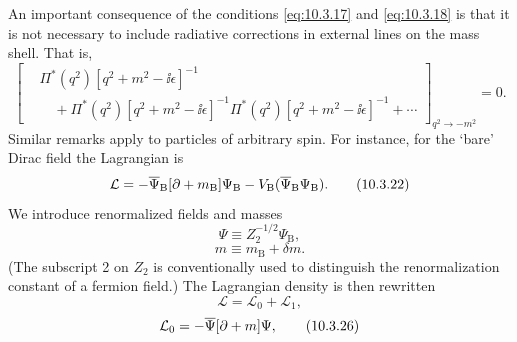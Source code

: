 An important consequence of the conditions \eqref{eq:10.3.17} and
\eqref{eq:10.3.18} is that it is not necessary to include radiative
corrections in external lines on the mass shell. That is,
\begin{equation}
\left[
\begin{aligned}
 &\Pi^*(q^2)[q^2+m^2-\ii\epsilon]^{-1}\\
 &\quad+\Pi^*(q^2)[q^2+m^2-\ii\epsilon]^{-1}\Pi^*(q^2)
 [q^2+m^2-\ii\epsilon]^{-1}+\cdots
\end{aligned}
\right]_{q^2\to-m^2}=0.
\tag{10.3.21}\label{eq:10.3.21}
\end{equation}
Similar remarks apply to particles of arbitrary spin. For instance, for the
`bare' Dirac field the Lagrangian is
\begin{equation}
\mathcal L=-\overline\Psi_{\mathrm B}[\sl{\partial}+m_{\mathrm B}]\Psi_{\mathrm B}
-V_{\mathrm B}(\overline\Psi_{\mathrm B}\Psi_{\mathrm B}).
\tag{10.3.22}\label{eq:10.3.22}
\end{equation}
We introduce renormalized fields and masses
\begin{equation}
\Psi\equiv Z_2^{-1/2}\Psi_{\mathrm B},
\tag{10.3.23}\label{eq:10.3.23}
\end{equation}
\begin{equation}
m\equiv m_{\mathrm B}+\delta m.
\tag{10.3.24}\label{eq:10.3.24}
\end{equation}
(The subscript 2 on $Z_2$ is conventionally used to distinguish the
renormalization constant of a fermion field.) The Lagrangian density is then
rewritten
\begin{equation}
\mathcal L=\mathcal L_0+\mathcal L_1,
\tag{10.3.25}\label{eq:10.3.25}
\end{equation}
\begin{equation}
\mathcal L_0=-\overline\Psi[\sl{\partial}+m]\Psi,
\tag{10.3.26}\label{eq:10.3.26}
\end{equation}
